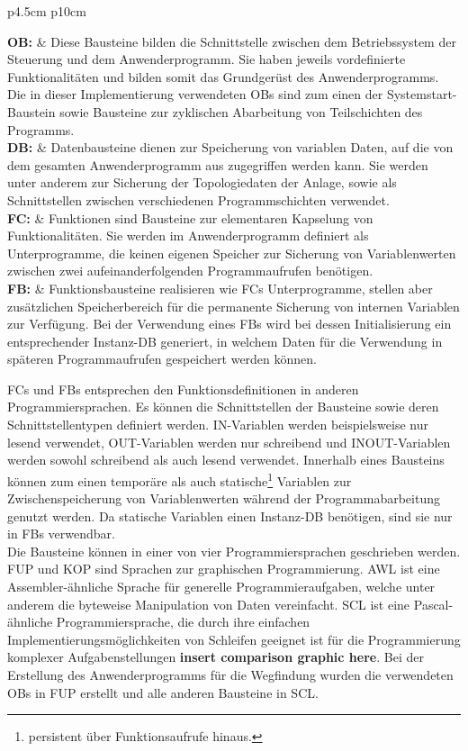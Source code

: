 			\begin{longtable}{{p{4.5cm} p{10cm}}}
				
				\textbf{\ac{OB}:} & Diese Bausteine bilden die Schnittstelle zwischen dem Betriebssystem der Steuerung und dem Anwenderprogramm. Sie haben jeweils vordefinierte Funktionalitäten und bilden somit das Grundgerüst des Anwenderprogramms. Die in dieser Implementierung verwendeten \ac{OB}s sind zum einen der Systemstart-Baustein sowie Bausteine zur zyklischen Abarbeitung von Teilschichten des Programms.\\[0.5cm]
				\textbf{\ac{DB}:} & Datenbausteine dienen zur Speicherung von variablen Daten, auf die von dem gesamten Anwenderprogramm  aus zugegriffen werden kann. Sie werden unter anderem zur Sicherung der Topologiedaten der Anlage, sowie als Schnittstellen zwischen verschiedenen Programmschichten verwendet.\\[0.5cm]
				\textbf{\ac{FC}:} & Funktionen sind Bausteine zur elementaren Kapselung von Funktionalitäten. Sie werden im Anwenderprogramm definiert als Unterprogramme, die keinen eigenen Speicher zur Sicherung von Variablenwerten zwischen zwei aufeinanderfolgenden Programmaufrufen benötigen.\\[0.5cm]
				\textbf{\ac{FB}:} & Funktionsbausteine realisieren wie \ac{FC}s Unterprogramme, stellen aber zusätzlichen Speicherbereich für die permanente Sicherung von internen Variablen zur Verfügung. Bei der Verwendung eines \ac{FB}s wird bei dessen Initialisierung ein entsprechender Instanz-\ac{DB} generiert, in welchem Daten für die Verwendung in späteren Programmaufrufen gespeichert werden können.\\[0.5cm]
				
			\end{longtable}
			
			\ac{FC}s und \ac{FB}s entsprechen den Funktionsdefinitionen in anderen Programmiersprachen. Es können die Schnittstellen der Bausteine sowie deren Schnittstellentypen definiert werden. IN-Variablen werden beispielsweise nur lesend verwendet, OUT-Variablen werden nur schreibend und INOUT-Variablen werden sowohl schreibend als auch lesend verwendet. Innerhalb eines Bausteins können zum einen temporäre als auch statische\footnote{persistent über Funktionsaufrufe hinaus.} Variablen zur Zwischenspeicherung von Variablenwerten während der Programmabarbeitung genutzt werden. Da statische Variablen einen Instanz-\ac{DB} benötigen, sind sie nur in \ac{FB}s verwendbar.
			\\
			Die Bausteine können in einer von vier Programmiersprachen geschrieben werden. \ac{FUP} und \ac{KOP} sind Sprachen zur graphischen Programmierung. \ac{AWL} ist eine Assembler-ähnliche Sprache für generelle Programmieraufgaben, welche unter anderem die byteweise Manipulation von Daten vereinfacht. \ac{SCL} ist eine Pascal-ähnliche Programmiersprache, die durch ihre einfachen Implementierungsmöglichkeiten von Schleifen geeignet ist für die Programmierung komplexer Aufgabenstellungen \textbf{insert comparison graphic here}. Bei der Erstellung des Anwenderprogramms für die Wegfindung wurden die verwendeten \ac{OB}s in \ac{FUP} erstellt und alle anderen Bausteine in SCL.
			
